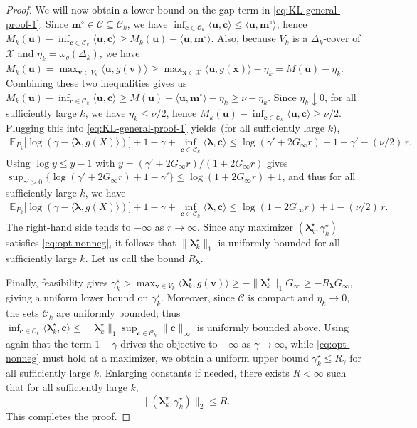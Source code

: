 \documentclass[10pt,a4paper]{amsart}
\newcommand{\boldlambda}{\boldsymbol{\lambda}}
\newcommand{\calC}{\mathcal C}
\newcommand{\calX}{\mathcal X}
\newcommand{\cvec}{\mathbf{c}}
\newcommand{\mvec}{\mathbf{m}}
\newcommand{\uvec}{\mathbf{u}}
\newcommand{\vvec}{\mathbf{v}}
\newcommand{\xvec}{\mathbf{x}}
\begin{document}
\begin{proof}
We will now obtain a lower bound on the gap term in \eqref{eq:KL-general-proof-1}. Since $\mvec^{\circ}\in\calC\subseteq \calC_k$, we have $\inf_{\cvec\in\calC_k}\langle \uvec,\cvec\rangle\le \langle \uvec,\mvec^{\circ}\rangle$, hence
$ M_k(\uvec)-\inf_{\cvec\in\calC_k}\langle \uvec,\cvec\rangle \ge M_k(\uvec)-\langle \uvec,\mvec^{\circ}\rangle$. 
Also, because $V_k$ is a $\Delta_k$-cover of $\calX$ and $\eta_k=\omega_g(\Delta_k)$, we have
$ M_k(\uvec)=\max_{\vvec\in V_k}\langle \uvec,g(\vvec)\rangle
\ge \max_{\xvec\in\calX}\langle \uvec,g(\xvec)\rangle-\eta_k
= M(\uvec)-\eta_k$. 
Combining these two inequalities gives us  $M_k(\uvec)-\inf_{\cvec\in\calC_k}\langle \uvec,\cvec\rangle \ge M(\uvec)-\langle \uvec,\mvec^{\circ}\rangle-\eta_k \ge \nu-\eta_k$. Since $\eta_k \downarrow 0$, for all sufficiently large $k$, we have $\eta_k\le \nu/2$, hence $M_k(\uvec)-\inf_{\cvec\in\calC_k}\langle \uvec,\cvec\rangle\ge \nu/2$. Plugging this into \eqref{eq:KL-general-proof-1} yields~(for all sufficiently large $k$),
\begin{align}
\mathbb E_{P_k}\!\big[\log(\gamma-\langle \boldlambda,g(X)\rangle)\big] + 1-\gamma + \inf_{\cvec\in\calC_k}\langle \boldlambda,\cvec\rangle \le \log(\gamma'+2G_\infty r) + 1-\gamma' - (\nu/2)\,r.
\end{align}
Using $\log y\le y-1$ with $y=(\gamma'+2G_\infty r)/(1+2G_\infty r)$ gives
$ \sup_{\gamma'>0}\{\log(\gamma'+2G_\infty r)+1-\gamma'\}\le \log(1+2G_\infty r)+1$, 
and thus for all sufficiently large $k$, we have
\begin{align}
\mathbb E_{P_k}\!\big[\log(\gamma-\langle \boldlambda,g(X)\rangle)\big] + 1-\gamma + \inf_{\cvec\in\calC_k}\langle \boldlambda,\cvec\rangle
\le \log(1+2G_\infty r)+1-(\nu/2)\,r.
\end{align}
The right-hand side tends to $-\infty$ as $r\to\infty$. Since any maximizer $(\boldlambda_k^\star,\gamma_k^\star)$ satisfies \eqref{eq:opt-nonneg}, it follows that $\|\boldlambda_k^\star\|_1$ is uniformly bounded for all sufficiently large $k$. Let us call the bound $R_{\boldlambda}$.

Finally, feasibility gives $\gamma_k^\star>\max_{\vvec\in V_k}\langle \boldlambda_k^\star,g(\vvec)\rangle\ge
-\|\boldlambda_k^\star\|_1 G_\infty\ge -R_{\boldlambda}G_\infty$, giving a uniform lower bound on $\gamma_k^\star$.
Moreover, since $\calC$ is compact and $\eta_k\to 0$, the sets $\calC_k$ are uniformly bounded; thus
$\inf_{\cvec\in\calC_k}\langle \boldlambda_k^\star,\cvec\rangle\le \|\boldlambda_k^\star\|_1\sup_{\cvec\in\calC_k}\|\cvec\|_\infty$
is uniformly bounded above. Using again that the term $1-\gamma$ drives the objective to $-\infty$ as $\gamma\to\infty$,
while \eqref{eq:opt-nonneg} must hold at a maximizer, we obtain a uniform upper bound $\gamma_k^\star\le R_\gamma$ for all sufficiently
large $k$. Enlarging constants if needed, there exists $R<\infty$ such that for all sufficiently large $k$,
\[
\|(\boldlambda_k^\star,\gamma_k^\star)\|_2\le R. \label{eq:theta-star-bound}
\]
This completes the proof.
\end{proof}
\end{document}
